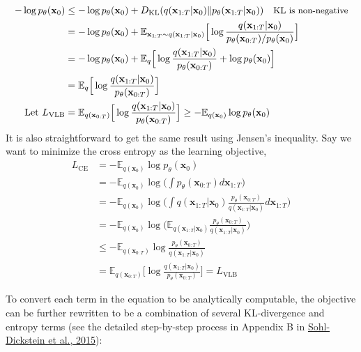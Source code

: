 \documentclass[12pt]{article}
\begin{document}
\[
\begin{aligned}
- \log p_\theta(\mathbf{x}_0) 
&\leq - \log p_\theta(\mathbf{x}_0) + D_\text{KL}(q(\mathbf{x}_{1:T}\vert\mathbf{x}_0) \| p_\theta(\mathbf{x}_{1:T}\vert\mathbf{x}_0) ) \quad \small{\text{KL is non-negative}}\\
&= - \log p_\theta(\mathbf{x}_0) + \mathbb{E}_{\mathbf{x}_{1:T}\sim q(\mathbf{x}_{1:T} \vert \mathbf{x}_0)} \Big[ \log\frac{q(\mathbf{x}_{1:T}\vert\mathbf{x}_0)}{p_\theta(\mathbf{x}_{0:T}) / p_\theta(\mathbf{x}_0)} \Big] \\
&= - \log p_\theta(\mathbf{x}_0) + \mathbb{E}_q \Big[ \log\frac{q(\mathbf{x}_{1:T}\vert\mathbf{x}_0)}{p_\theta(\mathbf{x}_{0:T})} + \log p_\theta(\mathbf{x}_0) \Big] \\
&= \mathbb{E}_q \Big[ \log \frac{q(\mathbf{x}_{1:T}\vert\mathbf{x}_0)}{p_\theta(\mathbf{x}_{0:T})} \Big] \\
\text{Let }L_\text{VLB} 
&= \mathbb{E}_{q(\mathbf{x}_{0:T})} \Big[ \log \frac{q(\mathbf{x}_{1:T}\vert\mathbf{x}_0)}{p_\theta(\mathbf{x}_{0:T})} \Big] \geq - \mathbb{E}_{q(\mathbf{x}_0)} \log p_\theta(\mathbf{x}_0)
\end{aligned}
\]
It is also straightforward to get the same result using Jensen's inequality. Say we want to minimize the cross entropy as the learning objective,
\[
\begin{aligned}
L_\text{CE}
&= - \mathbb{E}_{q(\mathbf{x}_0)} \log p_\theta(\mathbf{x}_0) \\
&= - \mathbb{E}_{q(\mathbf{x}_0)} \log \Big( \int p_\theta(\mathbf{x}_{0:T}) d\mathbf{x}_{1:T} \Big) \\
&= - \mathbb{E}_{q(\mathbf{x}_0)} \log \Big( \int q(\mathbf{x}_{1:T} \vert \mathbf{x}_0) \frac{p_\theta(\mathbf{x}_{0:T})}{q(\mathbf{x}_{1:T} \vert \mathbf{x}_{0})} d\mathbf{x}_{1:T} \Big) \\
&= - \mathbb{E}_{q(\mathbf{x}_0)} \log \Big( \mathbb{E}_{q(\mathbf{x}_{1:T} \vert \mathbf{x}_0)} \frac{p_\theta(\mathbf{x}_{0:T})}{q(\mathbf{x}_{1:T} \vert \mathbf{x}_{0})} \Big) \\
&\leq - \mathbb{E}_{q(\mathbf{x}_{0:T})} \log \frac{p_\theta(\mathbf{x}_{0:T})}{q(\mathbf{x}_{1:T} \vert \mathbf{x}_{0})} \\
&= \mathbb{E}_{q(\mathbf{x}_{0:T})}\Big[\log \frac{q(\mathbf{x}_{1:T} \vert \mathbf{x}_{0})}{p_\theta(\mathbf{x}_{0:T})} \Big] = L_\text{VLB}
\end{aligned}
\]

To convert each term in the equation to be analytically computable, the objective can be further rewritten to be a combination of several KL-divergence and entropy terms (see the detailed step-by-step process in Appendix B in \href{https://arxiv.org/abs/1503.03585}{Sohl-Dickstein et al., 2015}):
\end{document}

